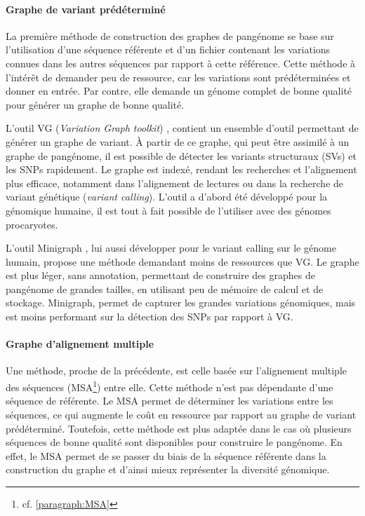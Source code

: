 \paragraph{Graphe de variant prédéterminé}

La première méthode de construction des graphes de pangénome se base sur l'utilisation d'une séquence référente et d'un fichier contenant les variations connues dans les autres séquences par rapport à cette référence. Cette méthode à l'intérêt de demander peu de ressource, car les variations sont prédéterminées et donner en entrée. Par contre, elle demande un génome complet de bonne qualité pour générer un graphe de bonne qualité.

L'outil VG (\textit{Variation Graph toolkit}) \cite{garrison_variation_2018}, contient un ensemble d'outil permettant de générer un graphe de variant. À partir de ce graphe, qui peut être assimilé à un graphe de pangénome, il est possible de détecter les variants structuraux (SVs) et les SNPs rapidement. Le graphe est indexé, rendant les recherches et l'alignement plus efficace, notamment dans l'alignement de lectures ou dans la recherche de variant génétique (\textit{variant calling}). L'outil a d'abord été développé pour la génomique humaine, il est tout à fait possible de l'utiliser avec des génomes procaryotes.

L'outil Minigraph \cite{li_design_2020}, lui aussi développer pour le variant calling sur le génome humain, propose une méthode demandant moins de ressources que VG. Le graphe est plus léger, sans annotation, permettant de construire des graphes de pangénome de grandes tailles, en utilisant peu de mémoire de calcul et de stockage. Minigraph, permet de capturer les grandes variations génomiques, mais est moins performant sur la détection des SNPs par rapport à VG.

\paragraph{Graphe d'alignement multiple}

Une méthode, proche de la précédente, est celle basée sur l'alignement multiple des séquences (MSA\footnote{cf. \autoref{paragraph:MSA}}) entre elle. Cette méthode n'est pas dépendante d'une séquence de référente. Le MSA permet de déterminer les variations entre les séquences, ce qui augmente le coût en ressource par rapport au graphe de variant prédéterminé. Toutefois, cette méthode est plus adaptée dans le cas où plusieurs séquences de bonne qualité sont disponibles pour construire le pangénome. En effet, le MSA permet de se passer du biais de la séquence référente dans la construction du graphe et d'ainsi mieux représenter la diversité génomique.


